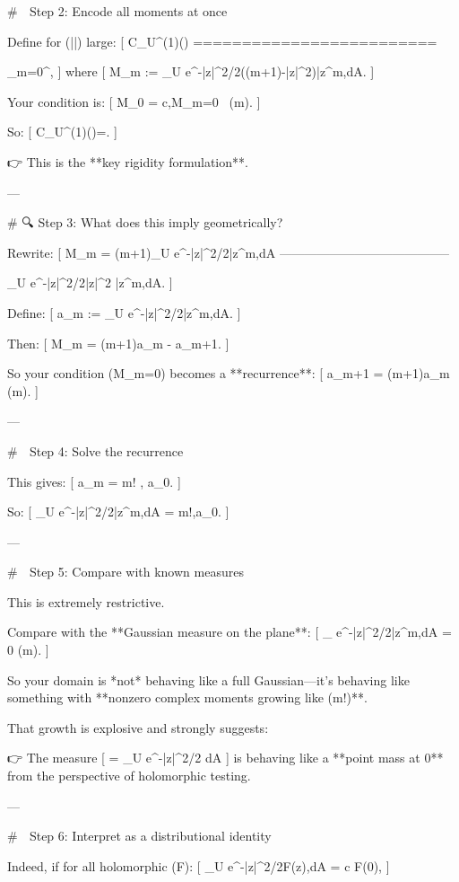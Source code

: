 # 🔁 Step 2: Encode all moments at once

Define for (|\zeta|) large:
[
\mathcal C_U^{(1)}(\zeta)
=========================

\sum_{m=0}^\infty {},
]
where
[
M_m := \int_U e^{-|z|^2/2}\big((m+1)-|z|^2\big)\bar z^m,dA.
]

Your condition is:
[
M_0 = c,\quad M_m=0 \ (m).
]

So:
[
\mathcal C_U^{(1)}(\zeta)=.
]

👉 This is the **key rigidity formulation**.

---

# 🔍 Step 3: What does this imply geometrically?

Rewrite:
[
M_m = (m+1)\int_U e^{-|z|^2/2}\bar z^m,dA
-----------------------------------------

\int_U e^{-|z|^2/2}|z|^2 \bar z^m,dA.
]

Define:
[
a_m := \int_U e^{-|z|^2/2}\bar z^m,dA.
]

Then:
[
M_m = (m+1)a_m - a_{m+1}.
]

So your condition (M_m=0) becomes a **recurrence**:
[
a_{m+1} = (m+1)a_m \quad (m).
]

---

# 🧮 Step 4: Solve the recurrence

This gives:
[
a_m = m! , a_0.
]

So:
[
\int_U e^{-|z|^2/2}\bar z^m,dA = m!,a_0.
]

---

# 🚨 Step 5: Compare with known measures

This is extremely restrictive.

Compare with the **Gaussian measure on the plane**:
[
\int_{} e^{-|z|^2/2}\bar z^m,dA = 0 \quad (m).
]

So your domain is *not* behaving like a full Gaussian—it’s behaving like something with **nonzero complex moments growing like (m!)**.

That growth is explosive and strongly suggests:

👉 The measure
[
\mu = _U e^{-|z|^2/2} dA
]
is behaving like a **point mass at 0** from the perspective of holomorphic testing.

---

# 🔬 Step 6: Interpret as a distributional identity

Indeed, if for all holomorphic (F):
[
\int_U e^{-|z|^2/2}F(z),dA = c F(0),
]

